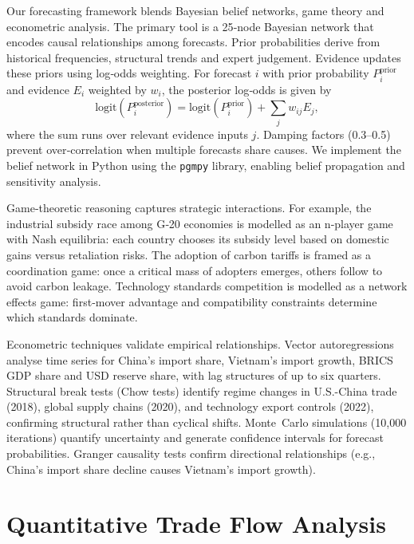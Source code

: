 \documentclass{article}
\begin{document}
Our forecasting framework blends Bayesian belief networks, game theory and econometric analysis.  The primary tool is a 25‑node Bayesian network that encodes causal relationships among forecasts.  Prior probabilities derive from historical frequencies, structural trends and expert judgement.  Evidence updates these priors using log‑odds weighting.  For forecast $i$ with prior probability $P_i^{\text{prior}}$ and evidence $E_i$ weighted by $w_i$, the posterior log‑odds is given by
\begin{equation}
\text{logit}(P_i^{\text{posterior}}) = \text{logit}(P_i^{\text{prior}}) + \sum_j w_{ij} E_j,
\end{equation}
where the sum runs over relevant evidence inputs $j$.  Damping factors (0.3–0.5) prevent over‑correlation when multiple forecasts share causes.  We implement the belief network in Python using the \texttt{pgmpy} library, enabling belief propagation and sensitivity analysis.

Game‑theoretic reasoning captures strategic interactions.  For example, the industrial subsidy race among G‑20 economies is modelled as an n‑player game with Nash equilibria: each country chooses its subsidy level based on domestic gains versus retaliation risks.  The adoption of carbon tariffs is framed as a coordination game: once a critical mass of adopters emerges, others follow to avoid carbon leakage.  Technology standards competition is modelled as a network effects game: first‑mover advantage and compatibility constraints determine which standards dominate.

Econometric techniques validate empirical relationships.  Vector autoregressions analyse time series for China’s import share, Vietnam’s import growth, BRICS GDP share and USD reserve share, with lag structures of up to six quarters.  Structural break tests (Chow tests) identify regime changes in U.S.-China trade (2018), global supply chains (2020), and technology export controls (2022), confirming structural rather than cyclical shifts.  Monte Carlo simulations (10,000 iterations) quantify uncertainty and generate confidence intervals for forecast probabilities.  Granger causality tests confirm directional relationships (e.g., China’s import share decline causes Vietnam’s import growth).

\section{Quantitative Trade Flow Analysis}
\end{document}

